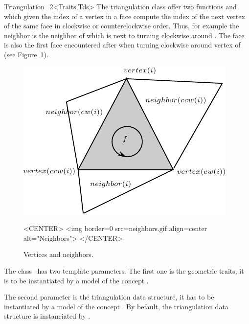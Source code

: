 \begin{ccRefClass}{Triangulation_2<Traits,Tds>}
The triangulation class
offer  two functions  and 
which given the index of a vertex in a face
compute the index of the next vertex  of the same face
in clockwise
or counterclockwise order.
 Thus, for example the neighbor 
 is
 the
neighbor of   which is next to  turning clockwise
around . The face 
is also the first face encountered after  when
turning clockwise around vertex 
of~ (see Figure~\ref{Triangulation_ref_Fig_neighbors}).



 \begin{figure}
\begin{ccTexOnly}
    \begin{center}
     \includegraphics{Triangulation_2/neighbors}
    \end{center}
\end{ccTexOnly} 
    \caption{Vertices and neighbors.
    \label{Triangulation_ref_Fig_neighbors}}
  \begin{ccHtmlOnly}
<CENTER>
<img border=0 src=neighbors.gif align=center alt="Neighbors">
</CENTER>
\end{ccHtmlOnly} 
\end{figure}




\ccParameters
The class \ccRefName\ has  two template parameters. The first one
 is the geometric traits, it is to be instantiated by
 a model of the concept .

The second parameter is the triangulation data structure,
it has to be instantiated by a model of the concept
.
By befault, the triangulation data structure  is instanciated by
.



\end{ccRefClass}
